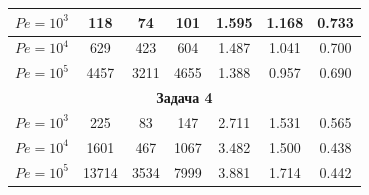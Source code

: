 \begin{center}
\begin{tabular}{|c|c|c|c|c|c|c|}
$Pe=10^3$ & 118 & 74 & 101 & 1.595 & 1.168 & 0.733 \\ 


\hline 


$Pe=10^4$ & 629 & 423 & 604 & 1.487 & 1.041 & 0.700 \\ 


\hline 


$Pe=10^5$ & 4457 & 3211 & 4655 & 1.388 & 0.957 & 0.690 \\ 


\hline 


\multicolumn{7}{|c|}{\bf Задача 4} \\ 


\hline 


$Pe=10^3$ & 225 & 83 & 147 & 2.711 & 1.531 & 0.565 \\ 


\hline 


$Pe=10^4$ & 1601 & 467 & 1067 & 3.482 & 1.500 & 0.438 \\ 


\hline 


$Pe=10^5$ & 13714 & 3534 & 7999 & 3.881 & 1.714 & 0.442 \\ 


\hline 


\end{tabular} 


\end{center} 


 


